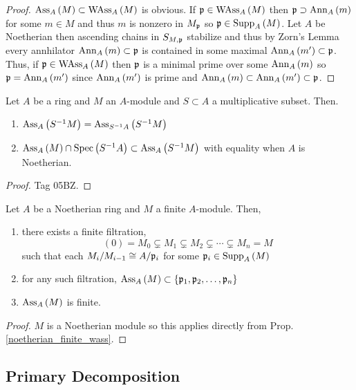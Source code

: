 \documentclass[12pt]{article}
\begin{document}
\begin{proof}
$\mathrm{Ass}_{A}\left( M \right) \subset \mathrm{WAss}_{A}\left(M \right)$ is obvious. If $\mathfrak{p} \in \mathrm{WAss}_{A}\left(M \right)$ then $\mathfrak{p} \supset \mathrm{Ann}_{A}\left(m\right)$ for some $m \in M$ and thus $m$ is nonzero in $M_{\mathfrak{p}}$ so $\mathfrak{p} \in \mathrm{Supp}_{A}\left(M \right)$. Let $A$ be Noetherian then ascending chains in $S_{M, \mathfrak{p}}$ stabilize and thus by Zorn's Lemma every annhilator $\mathrm{Ann}_{A}\left(m\right) \subset \mathfrak{p}$ is contained in some maximal $\mathrm{Ann}_{A}\left(m'\right) \subset \mathfrak{p}$. Thus, if $\mathfrak{p} \in \mathrm{WAss}_{A}\left(M \right)$ then $\mathfrak{p}$ is a minimal prime over some $\mathrm{Ann}_{A}\left(m\right)$ so $\mathfrak{p} = \mathrm{Ann}_{A}\left(m'\right)$ since $\mathrm{Ann}_{A}\left(m'\right)$ is prime and $\mathrm{Ann}_{A}\left(m\right) \subset \mathrm{Ann}_{A}\left(m'\right) \subset \mathfrak{p}$.
\end{proof}


\begin{lemma} \label{ass_primes_localization}
Let $A$ be a ring and $M$ an $A$-module and $S \subset A$ a multiplicative subset. Then.
\begin{enumerate}
\item $\mathrm{Ass}_{A}\left( S^{-1} M \right) = \mathrm{Ass}_{S^{-1} A}\left( S^{-1} M \right)$ 
\item $\mathrm{Ass}_{A}\left( M \right) \cap \mathrm{Spec}\left( S^{-1} A \right) \subset \mathrm{Ass}_{A}\left( S^{-1} M \right)$ with equality when $A$ is Noetherian.
\end{enumerate}
\end{lemma}

\begin{proof}
Tag 05BZ.
\end{proof}


\begin{proposition} \label{noetherian_finite_wass}
Let $A$ be a Noetherian ring and $M$ a finite $A$-module. Then,
\begin{enumerate}
\item there exists a finite filtration,
\[ (0) = M_0 \subsetneq M_1 \subsetneq M_2 \subsetneq \cdots \subsetneq M_n = M \]
such that each $M_{i} / M_{i-1} \cong A / \mathfrak{p}_{i}$ for some $\mathfrak{p}_i \in \mathrm{Supp}_{A} \left( M \right)$
\item for any such filtration, $\mathrm{Ass}_{A}\left( M \right) \subset \{ \mathfrak{p}_1, \mathfrak{p}_2, \dots, \mathfrak{p}_n\}$
\item $\mathrm{Ass}_{A}\left( M \right)$ is finite.
\end{enumerate}
\end{proposition}

\begin{proof}
$M$ is a Noetherian module so this applies directly from Prop. \ref{noetherian_finite_wass}.
\end{proof}

\subsection{Primary Decomposition}
\end{document}
